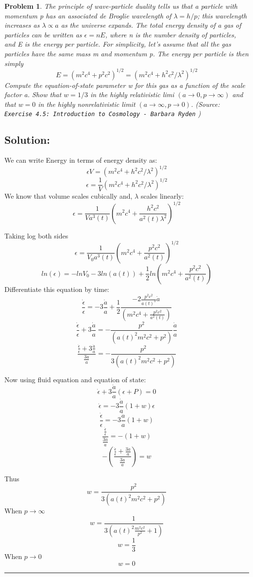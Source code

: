 \documentclass[11pt]{article}
\newenvironment{solution}{\subsection*{Solution:}}{\vspace{0.5cm} \hrule \vspace{0.7cm}}
\newtheorem{problem}{Problem}
\begin{document}
\begin{problem}
	The principle of wave-particle duality tells us that a particle with momentum
	p has an associated de Broglie wavelength of $\lambda = h/p$; this
	wavelength increases as $\lambda \propto a$ as the universe expands. The total
	energy density of a gas of particles can be written as $\epsilon = nE$, where n is
	the number density of particles, and E is the energy per particle. For
	simplicity, let’s assume that all the gas particles have the same mass
	m and momentum p. The energy per particle is then simply
	$$ E = (m^2c^4 + p^2 c^2)^{1/2} =   (m^2c^4 + h^2 c^2 / \lambda^2)^{1/2}$$
	Compute the equation-of-state parameter w for this gas as a function
	of the scale factor a. Show that $w = 1/3$ in the highly relativistic limi
	$(a \rightarrow 0, p \rightarrow \infty)$ and that $w = 0$ in the highly nonrelativistic limit
	$(a \rightarrow \infty, p \rightarrow 0)$.
        (Source: \texttt{Exercise 4.5: Introduction to Cosmology - Barbara Ryden} )

\end{problem}

\begin{solution}
        We can write Energy in terms of energy density as:
	$$ \epsilon V = (m^2c^4 + h^2 c^2 / \lambda^2)^{1/2} $$
	$$ \epsilon  = \frac{1}{V} (m^2c^4 + h^2 c^2 / \lambda^2)^{1/2} $$
	We know that volume scales cubically and, $\lambda$ scales linearly:
	$$ \epsilon  = \frac{1}{Va^3(t)} \left(m^2c^4 + \frac{h^2 c^2}{a^2(t)
		\lambda^2} \right)^{1/2} $$

	Taking log both sides
	$$ \epsilon  =\frac{1}{V_0 a^3(t)} \left(m^2c^4 + \frac{p^2 c^2}{a^2(t)} \right)^{1/2} $$
	$$ ln(\epsilon)  = -ln V_0 - 3 ln(a(t)) + \frac{1}{2} ln\left(m^2c^4 + \frac{p^2 c^2}{a^2(t)} \right) $$
	Differentiate this equation by time:
	$$ \frac{\dot \epsilon}{\epsilon}  = - 3 \frac{\dot a}{a} + \frac{1}{2}
	\frac{ -2 \frac{p^2c^2 }{a(t)^3} \dot a}{\left(m^2c^4 + \frac{p^2 c^2}{a^2(t)} \right)} $$
	$$ \frac{\dot \epsilon}{\epsilon} + 3 \frac{\dot a}{a} = - \frac{ p^2
	}{\left( a(t)^2 m^2c^2 + p^2 \right)}\frac{\dot a}{a} $$
	$$ \frac{\frac{\dot \epsilon}{\epsilon} + 3 \frac{\dot a}{a}}{\frac{3\dot a}{a}} = - \frac{ p^2
	}{3\left( a(t)^2 m^2c^2 + p^2 \right)} $$

	Now using fluid equation and equation of state:
	$$ \dot \epsilon + 3 \frac{\dot a}{a}(\epsilon + P) = 0$$
	$$ \dot \epsilon =- 3 \frac{\dot a}{a}(1+w)\epsilon$$
	$$ \frac{\dot \epsilon}{\epsilon} =- 3 \frac{\dot a}{a}(1+w)$$
	$$ \frac{\frac{\dot \epsilon}{\epsilon}}{\frac{3\dot a}{a}} =- (1+w)$$
	$$ - \left(\frac{\frac{\dot \epsilon}{\epsilon}  +
		\frac{3\dot a}{a}}{\frac{3\dot a}{a}}
		\right) =w$$

	Thus
	$$ w = \frac{p^2}{3\left( a(t)^2 m^2c^2 + p^2 \right)}  $$
	When $p\rightarrow \infty$
	$$ w = \frac{1}{3\left( a(t)^2 \frac{m^2c^2}{p^2} + 1 \right)}  $$
	$$ w = \frac{1}{3}  $$
	When $p\rightarrow 0$
	$$ w = 0 $$
\end{solution}
\end{document}
